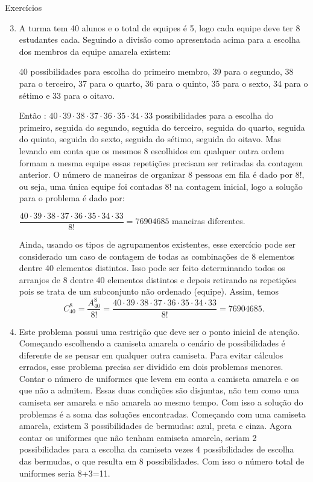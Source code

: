 \begin{answer}{Exercícios}
{\exerciselist
\begin{enumerate}\setcounter{enumi}{2}
\item A turma tem 40 alunos e o total de equipes é 5, logo cada equipe deve ter 8 estudantes cada. Seguindo a divisão como apresentada acima para a escolha dos membros da equipe amarela existem: 

40 possibilidades para escolha do primeiro membro, 39 para o segundo, 38 para o terceiro, 37 para o quarto, 36 para o quinto, 35 para o sexto, 34 para o sétimo e 33 para o oitavo. 

Então : $40 \cdot 39 \cdot 38 \cdot 37 \cdot 36 \cdot 35 \cdot 34 \cdot 33$ possibilidades para a escolha do primeiro, seguida do segundo, seguida do terceiro, seguida do quarto, seguida do quinto, seguida do sexto, seguida do sétimo, seguida do oitavo. Mas levando em conta que os mesmos 8 escolhidos em qualquer outra ordem formam a mesma equipe essas repetições precisam ser retiradas da contagem anterior. O número de maneiras de organizar 8 pessoas em fila é dado por $8!$, ou seja, uma única equipe foi contadas $8!$ na contagem inicial, logo a solução para o problema é dado por: 

$\dfrac{40 \cdot 39 \cdot 38 \cdot 37 \cdot 36 \cdot 35 \cdot 34 \cdot 33}{8!} = 76904685$ maneiras diferentes. 

Ainda, usando os tipos de agrupamentos existentes, esse exercício pode ser considerado um caso de contagem de todas as  combinações de 8 elementos dentre 40 elementos distintos. Isso pode ser feito determinando todos os arranjos de 8 dentre 40 elementos distintos e depois retirando as repetições pois se trata de um subconjunto não ordenado (equipe). Assim, temos  $$C_{40}^8=  \dfrac{A_{40}^8}{8!} = \dfrac{40 \cdot 39 \cdot 38 \cdot 37 \cdot 36 \cdot 35 \cdot 34 \cdot 33}{8!} = 76904685.$$

\item Este problema possui uma restrição que deve ser o ponto inicial de atenção. Começando escolhendo a camiseta amarela o cenário de possibilidades é diferente de se pensar em qualquer outra camiseta. Para evitar cálculos errados, esse problema precisa ser dividido em dois problemas menores. Contar o número de uniformes que levem em conta a camiseta amarela e os que não a admitem. Essas duas condições são disjuntas, não tem como uma camiseta ser amarela e não amarela ao mesmo tempo. Com isso a solução do problemas é a soma das soluções encontradas.
Começando com uma camiseta amarela, existem 3 possibilidades de bermudas: azul, preta e cinza. Agora contar os uniformes que não tenham camiseta amarela, seriam 2 possibilidades para a escolha da camiseta vezes 4 possibilidades de escolha das bermudas, o que resulta em 8 possibilidades. 
Com isso o número total de uniformes seria 8+3=11. 


\end{enumerate}}
\end{answer}
